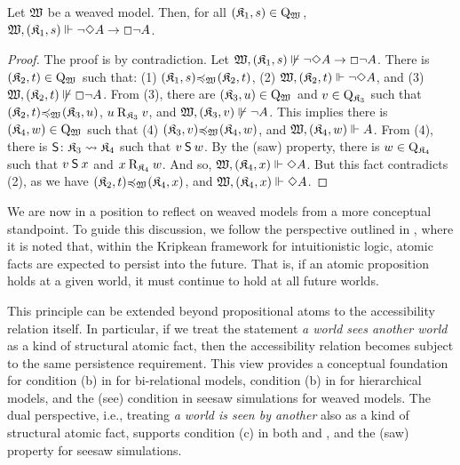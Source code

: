 \begin{proposition}
    Let $\wmodel$ be a weaved model.
    Then, for all ${\pair {\kmodel_1} s} \in \Qwm$, $\wforces{\pair {\kmodel_1} s}{\lnot \Diamond A \to \Box \lnot A}$.
\end{proposition}
\begin{proof}
    The proof is by contradiction.
    Let $\nwforces{\pair {\kmodel_1} s}{\lnot \Diamond A \to \Box \lnot A}$.
    There is ${\pair {\kmodel_2} t} \in \Qwm$ such that:
        (1) ${\pair {\kmodel_1} s} \Fwm {\pair {\kmodel_2} t}$,
        (2) $\wforces{\pair {\kmodel_2} t}{\lnot \Diamond A}$, and
        (3) $\nwforces{\pair {\kmodel_2} t}{\Box \lnot A}$.
    From (3),
        there are ${\pair {\kmodel_3} u} \in \Qwm$ and ${v \in \Wkm[3]}$ such that
            ${\pair {\kmodel_2} t} \Fwm {\pair {\kmodel_3} u}$,
            $u \Rkm[3] v$, and
            $\nwforces{\pair {\kmodel_3} v}{\lnot A}$.
    This implies there is ${\pair {\kmodel_4} w} \in \Qwm$ such that
        (4) ${\pair {\kmodel_3} v} \Fwm {\pair {\kmodel_4} w}$, and
        $\wforces{\pair {\kmodel_4} w}{A}$.
    From (4), there is $\Sim \colon \kmodel_3 \fsim \kmodel_4$ such that $v \Sim w$.
    By the (saw) property, there is $w \in \Wkm[4]$ such that $v \Sim x$ and $x \Rkm[4] w$.
    And so, $\wforces{\pair {\kmodel_4} x}{\Diamond A}$.
    But this fact contradicts (2), as we have
        ${\pair {\kmodel_2} t} \Fwm {\pair {\kmodel_4} x}$, and
        $\wforces{\pair {\kmodel_4} x}{\Diamond A}$.
\end{proof}

We are now in a position to reflect on weaved models from a more conceptual standpoint. To guide this discussion, we follow the perspective outlined in \cite{simpson1994}, where it is noted that, within the Kripkean framework for intuitionistic logic, atomic facts are expected to persist into the future. That is, if an atomic proposition holds at a given world, it must continue to hold at all future worlds.

This principle can be extended beyond propositional atoms to the accessibility relation itself. In particular, if we treat the statement \emph{a world sees another world} as a kind of structural atomic fact, then the accessibility relation becomes subject to the same persistence requirement. This view provides a conceptual foundation for condition (b) in  for bi-relational models, condition (b) in  for hierarchical models, and the (see) condition in seesaw simulations for weaved models.
The dual perspective, i.e., treating \emph{a world is seen by another} also as a kind of structural atomic fact, supports condition (c) in both  and , and the (saw) property for seesaw simulations.

